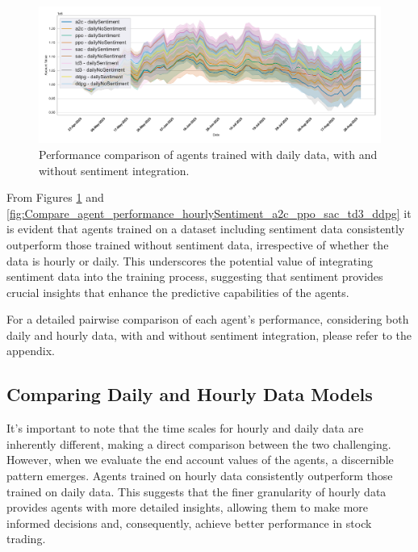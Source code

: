 \documentclass[12pt]{article}
\begin{document}
\begin{figure}[h]
    \centering
    \includegraphics[width=1\textwidth]{figs/Models_comparison/Compare_agent_performance_dailySentiment_a2c_ppo_sac_td3_ddpg.pdf}
    \caption{Performance comparison of agents trained with daily data, with and without sentiment integration.}
    \label{fig:Compare_agent_performance_dailySentiment_a2c_ppo_sac_td3_ddpg}
\end{figure}

From Figures \ref{fig:Compare_agent_performance_dailySentiment_a2c_ppo_sac_td3_ddpg} and  \ref{fig:Compare_agent_performance_hourlySentiment_a2c_ppo_sac_td3_ddpg} it is evident that agents trained on a dataset including sentiment data consistently outperform those trained without sentiment data, irrespective of whether the data is hourly or daily. This underscores the potential value of integrating sentiment data into the training process, suggesting that sentiment provides crucial insights that enhance the predictive capabilities of the agents.

For a detailed pairwise comparison of each agent's performance, considering both daily and hourly data, with and without sentiment integration, please refer to the appendix.


\subsection{Comparing Daily and Hourly Data Models}
It's important to note that the time scales for hourly and daily data are inherently different, making a direct comparison between the two challenging. However, when we evaluate the end account values of the agents, a discernible pattern emerges. Agents trained on hourly data consistently outperform those trained on daily data. This suggests that the finer granularity of hourly data provides agents with more detailed insights, allowing them to make more informed decisions and, consequently, achieve better performance in stock trading.
\end{document}
